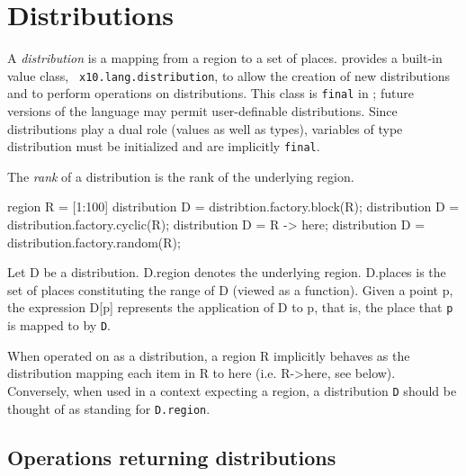 \section{Distributions}\label{XtenDistributions}

A {\em distribution} is a mapping from a region to a set of places.
{}\Xten{} provides a built-in value class, {\tt
x10.lang.distribution}, to allow the creation of new distributions and
to perform operations on distributions. This class is {\tt final} in
{}\XtenCurrVer; future versions of the language may permit
user-definable distributions. Since distributions play a dual role
(values as well as types), variables of type {\cf distribution} must
be initialized and are implicitly {\tt final}.

The {\em rank} of a distribution is the rank of the underlying region.



\begin{x10}
region R = [1:100]
distribution D = distribtion.factory.block(R);
distribution D = distribution.factory.cyclic(R);
distribution D = R -> here;
distribution D = distribution.factory.random(R);
\end{x10}

Let {\cf D} be a distribution. {\cf D.region} denotes the underlying
region. {\cf D.places} is the set of places constituting the range of
{\cf D} (viewed as a function). Given a point {\cf p}, the expression
{\cf D[p]} represents the application of {\cf D} to {\cf p}, that is, the
place that {\tt p} is mapped to by {\tt D}.

When operated on as a distribution, a region {\cf R} implicitly
behaves as the distribution mapping each item in {\cf R} to {\cf here}
(i.e.{} {\cf R->here}, see below). Conversely, when used in a context
expecting a region, a distribution {\tt D} should be thought of as
standing for {\tt D.region}.

{}

\subsection{Operations returning distributions}

